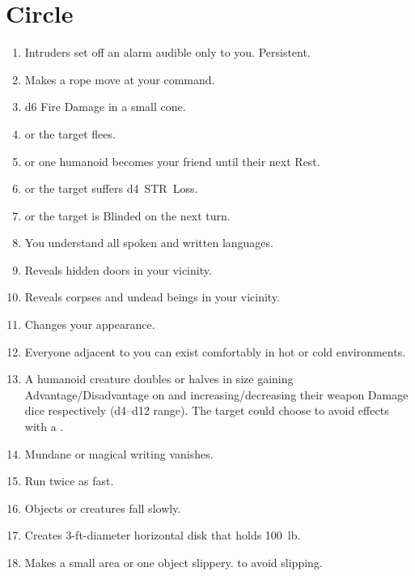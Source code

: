 \documentclass[itdr]{subfiles}
\begin{document}

\vfill
\break

\section{ Circle}
\def \spellcircle {1}
\begin{enumerate}
	\item {} Intruders set off an alarm audible only to you. Persistent.
	\item {} Makes a rope move at your command.
	\item {} d6 Fire Damage in a small cone.
	\item {}  or the target flees.
	\item {}  or one humanoid becomes your friend until their next Rest.
	\item {}  or the target suffers d4~STR~Loss.
	\item {}  or the target is Blinded on the next turn.
	\item {} You understand all spoken and written languages.
	\item {} Reveals hidden doors in your vicinity.
	\item {} Reveals corpses and undead beings in your vicinity.
	\item {} Changes your appearance.
	\item {} Everyone adjacent to you can exist comfortably in hot or cold environments.
	\item {} A humanoid creature doubles or halves in size gaining Advantage/Disadvantage on  and increasing/decreasing their weapon Damage dice respectively (d4--d12 range). The target could choose to avoid effects with a .
	\item {} Mundane or magical writing vanishes.
	\item {} Run twice as fast.
	\item {} Objects or creatures fall slowly.
	\item {} Creates 3-ft-diameter horizontal disk that holds 100~lb.
	\item {} Makes a small area or one object slippery.  to avoid slipping.

\end{enumerate}
\end{document}
